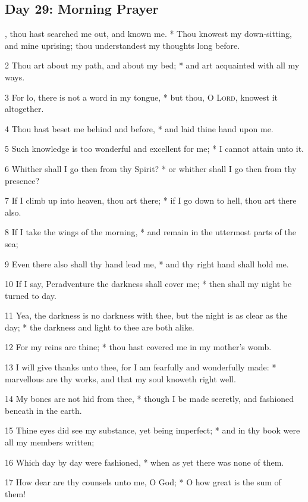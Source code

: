 \subsection{Day 29: Morning Prayer}
, thou hast searched me out, and known me. * Thou knowest my down-sitting, and mine uprising; thou understandest my thoughts long before.\par
2 Thou art about my path, and about my bed; * and art acquainted with all my ways.\par
3 For lo, there is not a word in my tongue, * but thou, O {\textsc{Lord}}, knowest it altogether.\par
4 Thou hast beset me behind and before, * and laid thine hand upon me.\par
5 Such knowledge is too wonderful and excellent for me; * I cannot attain unto it.\par
6 Whither shall I go then from thy Spirit? * or whither shall I go then from thy presence?\par
7 If I climb up into heaven, thou art there; * if I go down to hell, thou art there also.\par
8 If I take the wings of the morning, * and remain in the uttermost parts of the sea;\par
9 Even there also shall thy hand lead me, * and thy right hand shall hold me.\par
10 If I say, Peradventure the darkness shall cover me; * then shall my night be turned to day.\par
11 Yea, the darkness is no darkness with thee, but the night is as clear as the day; * the darkness and light to thee are both alike.\par
12 For my reins are thine; * thou hast covered me in my mother's womb.\par
13 I will give thanks unto thee, for I am fearfully and wonderfully made: * marvellous are thy works, and that my soul knoweth right well.\par
14 My bones are not hid from thee, * though I be made secretly, and fashioned beneath in the earth.\par
15 Thine eyes did see my substance, yet being imperfect; * and in thy book were all my members written;\par
16 Which day by day were fashioned, * when as yet there was none of them.\par
17 How dear are thy counsels unto me, O God; * O how great is the sum of them!\par
